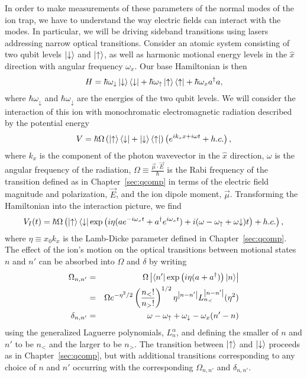 In order to make measurements of these parameters of the normal modes of the ion trap, we have to understand the way electric fields can interact with the modes.  In particular, we will be driving sideband transitions using lasers addressing narrow optical transitions.  Consider an atomic system consisting of two qubit levels $\left| \downarrow \right>$ and $\left| \uparrow \right>$, as well as harmonic motional energy levels in the $\hat{x}$ direction with angular frequency $\omega_x$.  Our base Hamiltonian is then
\begin{equation}
	H = \hbar \omega_\downarrow \left| \downarrow \right>\left< \downarrow \right| + \hbar \omega_\uparrow \left| \uparrow \right>\left< \uparrow \right| + \hbar \omega_x a^\dagger a \mathrm{,}
\end{equation}
where $\hbar \omega_\downarrow$ and $\hbar \omega_\downarrow$ are the energies of the two qubit levels.  We will consider the interaction of this ion with monochromatic electromagnetic radiation described by the potential energy
\begin{equation}
	V = \hbar \Omega \left( \left| \uparrow \right>\left< \downarrow \right| + \left| \downarrow \right> \left< \uparrow \right| \right) \left( e^{i k_x x + i \omega t} + h.c. \right) \mathrm{,}
\end{equation}
where $k_x$ is the component of the photon wavevector in the $\hat{x}$ direction, $\omega$ is the angular frequency of the radiation, $\Omega \equiv \frac{\vec{\mu} \cdot \vec{E}}{\hbar}$ is the Rabi frequency of the transition defined as in Chapter~\ref{sec:qcomp} in terms of the electric field magnitude and polarization, $\vec{E}$, and the ion dipole moment, $\vec{\mu}$.  Transforming the Hamiltonian into the interaction picture, we find
\begin{equation}
	V_I(t) = \hbar \Omega \left( \left| \uparrow \right>\left< \downarrow \right| \exp \left( i \eta (a e^{-i \omega_x t} + a^\dagger e^{i \omega_x t}) + i (\omega - \omega_{\uparrow} + \omega{\downarrow}) t \right) + h.c. \right) \mathrm{,}
\end{equation}
where $\eta \equiv x_0 k_x$ is the Lamb-Dicke parameter defined in Chapter~\ref{sec:qcomp}.  The effect of the ion's motion on the optical transitions between motional states $n$ and $n'$ can be absorbed into $\Omega$ and $\delta$ by writing
\begin{eqnarray}
	\Omega_{n,n'} &=& \Omega \left| \left< n' \right| \exp\left( i \eta (a + a^\dagger ) \right) \left| n \right> \right| \\
	&=& \Omega e^{-\eta^2 / 2} \left( \frac{n_<!}{n_>!} \right)^{1/2} \eta^{\left| n - n' \right| } L_{n_<}^{\left| n - n' \right| }(\eta^2) \\
	\delta_{n,n'} &=& \omega - \omega_\uparrow + \omega_\downarrow - \omega_x (n' - n)
\end{eqnarray}
using the generalized Laguerre polynomials, $L_n^\alpha$, and defining the smaller of $n$ and $n'$ to be $n_<$ and the larger to be $n_>$.  The transition between $\left| \uparrow \right>$ and $\left| \downarrow \right>$ proceeds as in Chapter~\ref{sec:qcomp}, but with additional transitions corresponding to any choice of $n$ and $n'$ occurring with the corresponding $\Omega_{n,n'}$ and $\delta_{n,n'}$.

